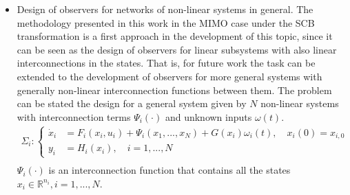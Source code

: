 \documentclass[11pt,letterpaper,twoside,openright]{report}
\begin{document}
\begin{itemize}
	\item Design of observers for networks of non-linear systems in general. The methodology presented in this work in the MIMO case under the SCB transformation is a first approach in the development of this topic, since it can be seen as the design of observers for linear subsystems with also linear interconnections in the states. That is, for future work the task can be extended to the development of observers for more general systems with generally non-linear interconnection functions between them. The problem can be stated the design for a general system given by $N$ non-linear systems with interconnection terms $\Psi_i(\cdot)$ and unknown inputs $\omega(t)$.
	\begin{equation}
		\begin{split}
			\Sigma_i: \left\{
			\begin{array}{rl}
				\dot{x}_i & = F_i(x_i,u_i) + \Psi_i(x_1,...,x_ N) + G(x_i)\omega_i(t), \quad x_i(0)=x_{i,0} \\
				y_i & = H_i(x_i), \quad i=1,...,N
			\end{array}
			\right. \\
		\end{split}
	\end{equation}
	$\Psi_i(\cdot)$ is an interconnection function that contains all the states $x_i \in \mathbb{R}^{n_i},i=1,...,N$.
\end{itemize}












	
		

	
	
\end{document}
